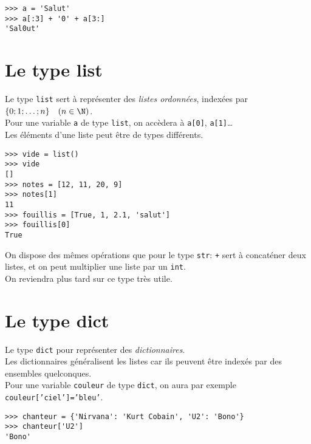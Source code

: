 \begin{pys}\begin{verbatim}
>>> a = 'Salut'
>>> a[:3] + '0' + a[3:]
'Sal0ut'
\end{verbatim}
\end{pys}

\section{Le type list}

Le type \texttt{list} sert à représenter des \textit{listes ordonnées}, indexées par $\lbrace 0;1;\ldots ;n\rbrace\quad (n\in\N)$.\\
Pour une variable \texttt{a} de type \texttt{list}, on accèdera à \texttt{a[0]}, \texttt{a[1]}\ldots\\
Les éléments d'une liste peut être de types différents.

\begin{pys}\begin{verbatim}
>>> vide = list()
>>> vide
[]
>>> notes = [12, 11, 20, 9]
>>> notes[1]
11
>>> fouillis = [True, 1, 2.1, 'salut']
>>> fouillis[0]
True
\end{verbatim}
\end{pys}

On dispose des mêmes opérations que pour le type \texttt{str}: \texttt{+} sert à concaténer deux listes, et on peut multiplier une liste par un \texttt{int}.\\

On reviendra plus tard sur ce type très utile.

\section{Le type dict}
Le type \texttt{dict} pour représenter des \textit{dictionnaires}.\\
Les dictionnaires généralisent les listes car ils peuvent être indexés par des ensembles quelconques.\\
Pour une variable \texttt{couleur} de type \texttt{dict}, on aura par exemple \texttt{couleur['ciel']='bleu'}.

\begin{pys}\begin{verbatim}
>>> chanteur = {'Nirvana': 'Kurt Cobain', 'U2': 'Bono'}
>>> chanteur['U2']
'Bono'
\end{verbatim}
\end{pys}


